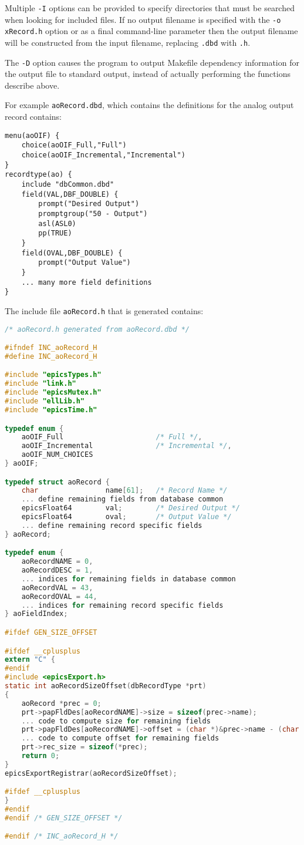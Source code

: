 Multiple \verb|-I| options can be provided to specify directories that must be searched when looking for included files.
If no output filename is specified with the \verb|-o xRecord.h| option or as a final command-line parameter then the output filename will be constructed from the input filename, replacing \verb|.dbd| with \verb|.h|.

The \verb|-D| option causes the program to output Makefile dependency information for the output file to standard output, instead of actually performing the functions describe above.

For example \verb|aoRecord.dbd|, which contains the definitions for the analog output record contains:

\begin{verbatim}
menu(aoOIF) {
    choice(aoOIF_Full,"Full")
    choice(aoOIF_Incremental,"Incremental")
}
recordtype(ao) {
    include "dbCommon.dbd" 
    field(VAL,DBF_DOUBLE) {
        prompt("Desired Output")
        promptgroup("50 - Output")
        asl(ASL0)
        pp(TRUE)
    }
    field(OVAL,DBF_DOUBLE) {
        prompt("Output Value")
    }
    ... many more field definitions
}
\end{verbatim}

The include file \verb|aoRecord.h| that is generated contains:

\begin{lstlisting}[language=C]
/* aoRecord.h generated from aoRecord.dbd */

#ifndef INC_aoRecord_H
#define INC_aoRecord_H

#include "epicsTypes.h"
#include "link.h"
#include "epicsMutex.h"
#include "ellLib.h"
#include "epicsTime.h"

typedef enum {
    aoOIF_Full                      /* Full */,
    aoOIF_Incremental               /* Incremental */,
    aoOIF_NUM_CHOICES
} aoOIF;

typedef struct aoRecord {
    char                name[61];   /* Record Name */
    ... define remaining fields from database common
    epicsFloat64        val;        /* Desired Output */
    epicsFloat64        oval;       /* Output Value */
    ... define remaining record specific fields
} aoRecord;

typedef enum {
    aoRecordNAME = 0,
    aoRecordDESC = 1,
    ... indices for remaining fields in database common
    aoRecordVAL = 43,
    aoRecordOVAL = 44,
    ... indices for remaining record specific fields
} aoFieldIndex;

#ifdef GEN_SIZE_OFFSET

#ifdef __cplusplus
extern "C" {
#endif
#include <epicsExport.h>
static int aoRecordSizeOffset(dbRecordType *prt)
{
    aoRecord *prec = 0;
    prt->papFldDes[aoRecordNAME]->size = sizeof(prec->name);
    ... code to compute size for remaining fields
    prt->papFldDes[aoRecordNAME]->offset = (char *)&prec->name - (char *)prec;
    ... code to compute offset for remaining fields
    prt->rec_size = sizeof(*prec);
    return 0;
}
epicsExportRegistrar(aoRecordSizeOffset);

#ifdef __cplusplus
}
#endif
#endif /* GEN_SIZE_OFFSET */

#endif /* INC_aoRecord_H */
\end{lstlisting}

